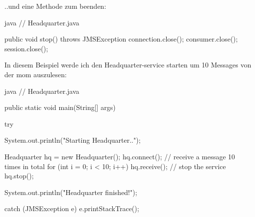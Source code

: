 ..und eine Methode zum beenden:

\begin{code}{java}
// Headquarter.java

public void stop() throws JMSException {
    connection.close();
    consumer.close();
    session.close();
}
\end{code}

In diesem Beispiel werde ich den Headquarter-service starten um 10 Messages von der \gls{mom} auszulesen:

\begin{code}{java}
// Headquarter.java

public static void main(String[] args) {
    try {
        System.out.println("Starting Headquarter..");

        Headquarter hq = new Headquarter();
        hq.connect();
        // receive a message 10 times in total
        for (int i = 0; i < 10; i++) {
            hq.receive();
        }
        // stop the service
        hq.stop();

        System.out.println("Headquarter finished!");
    } catch (JMSException e) {
        e.printStackTrace();
    }
}
\end{code}
